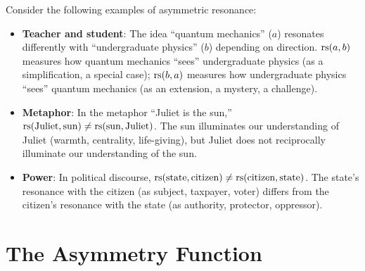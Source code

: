 Consider the following examples of asymmetric resonance:
\begin{itemize}
    \item \textbf{Teacher and student}: The idea ``quantum mechanics''
    ($a$) resonates differently with ``undergraduate physics'' ($b$)
    depending on direction. $\mathrm{rs}(a,b)$ measures how quantum mechanics
    ``sees'' undergraduate physics (as a simplification, a special case);
    $\mathrm{rs}(b,a)$ measures how undergraduate physics ``sees'' quantum
    mechanics (as an extension, a mystery, a challenge).

    \item \textbf{Metaphor}: In the metaphor ``Juliet is the sun,''
    $\mathrm{rs}(\text{Juliet}, \text{sun}) \neq \mathrm{rs}(\text{sun}, \text{Juliet})$.
    The sun illuminates our understanding of Juliet (warmth, centrality,
    life-giving), but Juliet does not reciprocally illuminate our
    understanding of the sun.

    \item \textbf{Power}: In political discourse,
    $\mathrm{rs}(\text{state}, \text{citizen}) \neq \mathrm{rs}(\text{citizen},
    \text{state})$. The state's resonance with the citizen (as subject,
    taxpayer, voter) differs from the citizen's resonance with the state
    (as authority, protector, oppressor).
\end{itemize}

\section{The Asymmetry Function}

